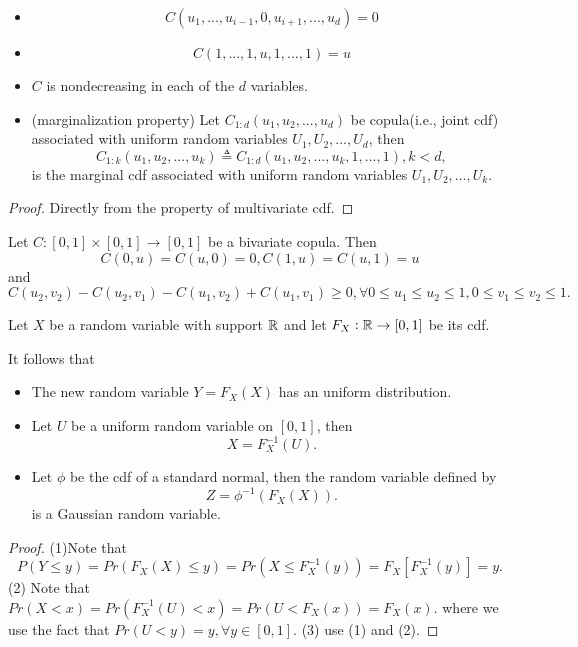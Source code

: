 \begin{refsection}
\begin{lemma}\label{ch:statistical-models:th:basicpropertiesofcopulas}\hfill
\begin{itemize}
	\item 	$$C(u_1,...,u_{i-1},0,u_{i+1},...,u_d) = 0$$
	\item $$C(1,...,1,u,1,...,1) = u$$
	\item $C$ is nondecreasing in each of the $d$ variables.
	\item (marginalization property) Let $C_{1:d}(u_1,u_2,...,u_d)$ be copula(i.e., joint cdf) associated with uniform random variables $U_1,U_2,...,U_d$, then 
	$$C_{1:k}(u_1,u_2,...,u_k) \triangleq C_{1:d}(u_1,u_2,...,u_k,1,...,1),k < d,$$
	is the marginal cdf associated with uniform random variables $U_1,U_2,...,U_k$.
\end{itemize}
\end{lemma}
\begin{proof}
Directly from the property of multivariate cdf.
\end{proof}

\begin{corollary}
	Let $C:[0,1]\times[0,1]\to [0,1]$ be a bivariate copula. Then
	$$C(0,u) = C(u,0) = 0, C(1,u) = C(u,1) = u$$
	and
	$$C(u_2,v_2) - C(u_2,v_1) - C(u_1,v_2) + C(u_1,v_1)\geq 0,\forall 0\leq u_1\leq u_2 \leq 1, 0\leq v_1\leq v_2\leq 1.$$
\end{corollary}

\begin{lemma}\label{ch:statistical-models:th:probabilityintegraltransform}
Let $X$ be a random variable with support $\mathbb{R}$ and let $F_X: \mathbb{R}\to [0,1]$ be its cdf. 

It follows that
\begin{itemize}
	\item The new random variable $Y = F_X(X)$ has an uniform distribution.
	\item Let $U$ be a uniform random variable on $[0,1]$, then
	$$X = F^{-1}_X(U).$$   
	\item Let $\phi$ be the cdf of a standard normal, then the random variable defined by
	$$Z = \phi^{-1}(F_X(X)).$$
	is a Gaussian random variable.
\end{itemize} 
\end{lemma}
\begin{proof}
(1)Note that
$$P(Y\leq y) = Pr(F_X(X) \leq y) = Pr(X \leq F_X^{-1}(y)) = F_X[F_X^{-1}(y)] = y.$$
(2) Note that
$Pr(X < x) = Pr(F^{-1}_X(U) < x) = Pr(U < F_X(x)) = F_X(x).$
where we use the fact that $Pr(U < y) = y, \forall y\in [0,1]$.
(3) use (1) and (2).
\end{proof}





\end{refsection}
